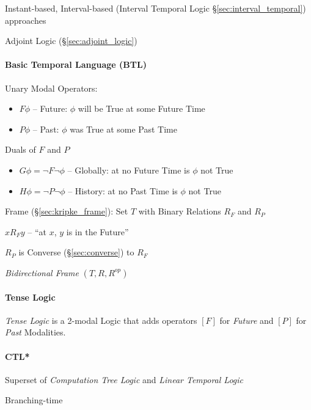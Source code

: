 Instant-based, Interval-based (Interval Temporal Logic
\S\ref{sec:interval_temporal}) approaches

Adjoint Logic (\S\ref{sec:adjoint_logic})



\paragraph{Basic Temporal Language (BTL)}\label{sec:btl}\hfill

Unary Modal Operators:
\begin{itemize}
  \item $F\phi$ -- Future: $\phi$ will be True at some Future Time
  \item $P\phi$ -- Past: $\phi$ was True at some Past Time
\end{itemize}

Duals of $F$ and $P$
\begin{itemize}
  \item $G\phi = \neg F \neg\phi$ -- Globally: at no Future Time is
    $\phi$ not True
  \item $H\phi = \neg P \neg\phi$ -- History: at no Past Time is
    $\phi$ not True
\end{itemize}

Frame (\S\ref{sec:kripke_frame}): Set $T$ with Binary Relations $R_F$
and $R_P$

$x R_F y$ -- ``at $x$, $y$ is in the Future''

$R_P$ is Converse (\S\ref{sec:converse}) to $R_F$

\emph{Bidirectional Frame} $(T,R,R^{op})$



\paragraph{Tense Logic}\label{sec:tense_logic}\hfill

\emph{Tense Logic} is a 2-modal Logic that adds operators $[F]$ for
\emph{Future} and $[P]$ for \emph{Past} Modalities.



\paragraph{CTL*}\label{sec:ctl_star}\hfill

Superset of \emph{Computation Tree Logic} and \emph{Linear
  Temporal Logic}

Branching-time



